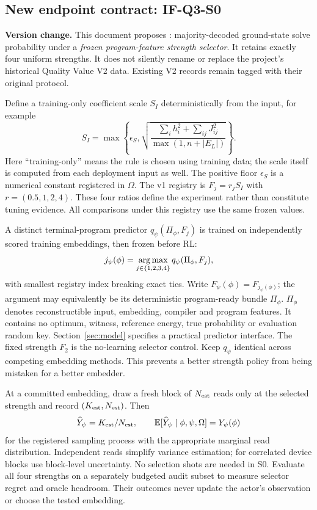 \subsection{New endpoint contract: IF-Q3-S0}
\begin{decisionbox}
\textbf{Version change.} This document proposes : majority-decoded ground-state solve probability under a \emph{frozen program-feature strength selector}. It retains exactly four uniform strengths. It does not silently rename or replace the project's historical Quality Value V2 data. Existing V2 records remain tagged with their original protocol.
\end{decisionbox}

Define a training-only coefficient scale $S_I$ deterministically from the input, for example
\begin{equation}
S_I=\max\left\{\epsilon_S,\sqrt{\frac{\sum_i h_i^2+\sum_{ij}J_{ij}^2}{\max(1,n+|E_L|)}}\right\}.
\end{equation}
Here ``training-only'' means the rule is chosen using training data; the scale itself is computed from each deployment input as well. The positive floor $\epsilon_S$ is a numerical constant registered in $\Omega$. The v1 registry is $F_j=r_jS_I$ with $r=(0.5,1,2,4)$. These four ratios define the experiment rather than constitute tuning evidence. All comparisons under this registry use the same frozen values.

A distinct terminal-program predictor $q_\psi(\Pi_\phi,F_j)$ is trained on independently scored training embeddings, then frozen before RL:
\begin{equation}
j_\psi(\phi)=\operatorname*{arg\,max}_{j\in\{1,2,3,4\}}q_\psi(\Pi_\phi,F_j),
\label{eq:strength-selector}
\end{equation}
with smallest registry index breaking exact ties. Write $F_\psi(\phi)=F_{j_\psi(\phi)}$; the argument may equivalently be its deterministic program-ready bundle $\Pi_\phi$. $\Pi_\phi$ denotes reconstructible input, embedding, compiler and program features. It contains no optimum, witness, reference energy, true probability or evaluation random key. Section~\ref{sec:model} specifies a practical predictor interface. The fixed strength $F_2$ is the no-learning selector control. Keep $q_\psi$ identical across competing embedding methods. This prevents a better strength policy from being mistaken for a better embedder.

At a committed embedding, draw a fresh block of $N_{\rm est}$ reads only at the selected strength and record $(K_{\rm est},N_{\rm est})$. Then
\begin{equation}
\widehat Y_\psi=K_{\rm est}/N_{\rm est},\qquad
\mathbb{E}[\widehat Y_\psi\mid\phi,\psi,\Omega]=Y_\psi(\phi)
\label{eq:unbiased}
\end{equation}
for the registered sampling process with the appropriate marginal read distribution. Independent reads simplify variance estimation; for correlated device blocks use block-level uncertainty. No selection shots are needed in S0. Evaluate all four strengths on a separately budgeted audit subset to measure selector regret and oracle headroom. Their outcomes never update the actor's observation or choose the tested embedding.

